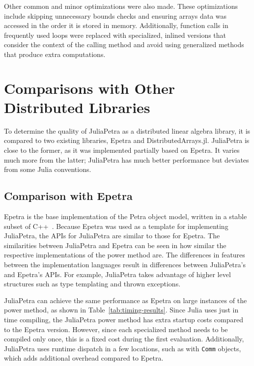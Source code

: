 \documentclass[acmsmall]{acmart}
\newcommand{\snippet}[1]{\lstinline[mathescape]{#1}}
\begin{document}
	Other common and minor optimizations were also made.
	These optimizations include skipping unnecessary bounds checks
	and ensuring arrays data was accessed in the order it is stored in memory.
	Additionally, function calls in frequently used loops were replaced with specialized, inlined versions that consider the context of the calling method and avoid using generalized methods that produce extra computations.
	
	\section{Comparisons with Other Distributed Libraries}
	
	To determine the quality of JuliaPetra as a distributed linear algebra library, it is compared to two existing libraries, Epetra and DistributedArrays.jl.
	JuliaPetra is close to the former, as it was implemented partially based on Epetra.
	It varies much more from the latter; JuliaPetra has much better performance but deviates from some Julia conventions.
	
	\subsection{Comparison with Epetra}
	
	Epetra is the base implementation of the Petra object model,
	written in a stable subset of C++~\cite{Heroux:2005:Trilinos}.
	Because Epetra was used as a template for implementing JuliaPetra,
	the APIs for JuliaPetra are similar to those for Epetra.
	The similarities between JuliaPetra and Epetra can be seen in how similar the respective implementations
	of the power method are.
	The differences in features between the implementation languages result in differences
	between JuliaPetra's and Epetra's APIs.
	For example, JuliaPetra takes advantage of higher level structures
	such as type templating and thrown exceptions.
	
	JuliaPetra can achieve the same performance as Epetra on large instances of the power method, as shown in Table~\ref{tab:timing-results}.
	Since Julia uses just in time compiling, the JuliaPetra power method has extra startup costs compared to
	the Epetra version. However, since each specialized method needs to be compiled only once,
	this is a fixed cost during the first evaluation.
	Additionally, JuliaPetra uses runtime dispatch in a few locations, such as with
	\snippet{Comm} objects, which adds additional overhead compared to Epetra.
	
\end{document}
